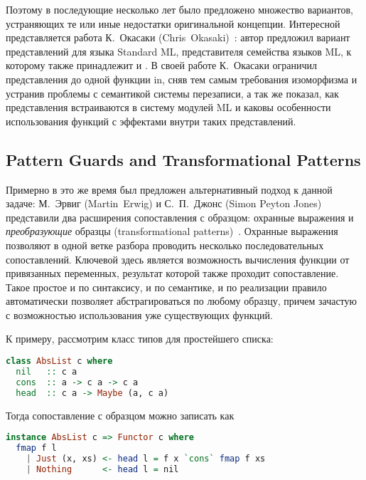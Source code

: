 Поэтому в последующие несколько лет было предложено множество вариантов, устраняющих те или иные недостатки оригинальной концепции. Интересной представляется работа К.~Окасаки (Chris~Okasaki)~\cite{okasaki98views}: автор предложил вариант представлений для языка Standard ML, представителя семейства языков ML, к которому также принадлежит и \ocaml. В своей работе К.~Окасаки ограничил представления до одной функции in, сняв тем самым требования изоморфизма и устранив проблемы с семантикой системы перезаписи, а так же показал, как представления встраиваются в систему модулей ML и каковы особенности использования функций с эффектами внутри таких представлений.

\subsection{Pattern Guards and Transformational Patterns} \label{sec:pattern_guards}
Примерно в это же время был предложен альтернативный подход к данной задаче: М.~Эрвиг (Martin~Erwig) и С.~П.~Джонс (Simon Peyton Jones) представили два расширения сопоставления с образцом: охранные выражения и \textit{преобразующие} образцы (transformational patterns)~\cite{erwig2000pattern}. Охранные выражения позволяют в одной ветке разбора проводить нес\-колько последовательных сопоставлений. Ключевой здесь является возможность вычисления функции от привязанных переменных, результат которой также проходит сопоставление.  Такое простое и по синтаксису, и по семантике, и по реализации правило автоматически позволяет абстрагироваться по любому образцу, причем зачастую с возможностью использования уже существующих функций. 

К примеру, рассмотрим класс типов для простейшего списка:

\noindent
\begin{minipage}{\linewidth}
\begin{lstlisting}[language=haskell]
class AbsList c where
  nil   :: c a
  cons  :: a -> c a -> c a
  head  :: c a -> Maybe (a, c a)
\end{lstlisting}
\end{minipage}

Тогда сопоставление с образцом можно записать как

\noindent
\begin{minipage}{\linewidth}
\begin{lstlisting}[language=haskell]
instance AbsList c => Functor c where
  fmap f l 
    | Just (x, xs) <- head l = f x `cons` fmap f xs
    | Nothing      <- head l = nil
\end{lstlisting}
\end{minipage}

